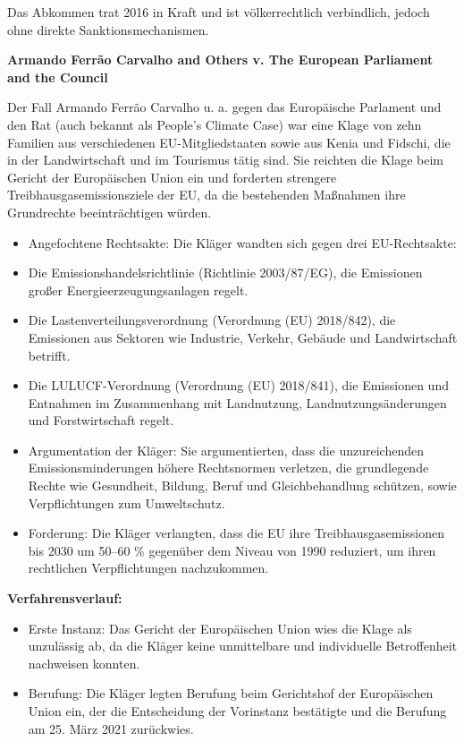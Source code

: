 \documentclass[a4paper, 12pt]{article} %
\begin{document}
 Das Abkommen trat 2016 in Kraft und ist völkerrechtlich verbindlich, jedoch ohne direkte Sanktionsmechanismen.

 \textbf{\cite{ArmandoFerraoCarvalho} Armando {{Ferrão Carvalho}} and {{Others}} v. {{The European Parliament}} and the {{Council}}}

 Der Fall Armando Ferrão Carvalho u. a. gegen das Europäische Parlament und den Rat (auch bekannt als \glqq{}People's Climate Case\grqq{}) war eine
  Klage von zehn Familien aus verschiedenen EU-Mitgliedstaaten sowie aus Kenia und Fidschi, die in der Landwirtschaft und im Tourismus tätig sind.
   Sie reichten die Klage beim Gericht der Europäischen 
 Union ein und forderten strengere Treibhausgasemissionsziele der EU, da die bestehenden Maßnahmen ihre Grundrechte beeinträchtigen würden.

 \begin{itemize}
    \item Angefochtene Rechtsakte: Die Kläger wandten sich gegen drei EU-Rechtsakte:
    \item Die Emissionshandelsrichtlinie (Richtlinie 2003/87/EG), die Emissionen großer Energieerzeugungsanlagen regelt.
    \item Die Lastenverteilungsverordnung (Verordnung (EU) 2018/842), die Emissionen aus Sektoren wie Industrie, Verkehr, Gebäude und Landwirtschaft betrifft.
    \item Die LULUCF-Verordnung (Verordnung (EU) 2018/841), die Emissionen und Entnahmen im Zusammenhang mit Landnutzung, Landnutzungsänderungen und Forstwirtschaft regelt.
    \item Argumentation der Kläger: Sie argumentierten, dass die unzureichenden Emissionsminderungen höhere Rechtsnormen verletzen, die grundlegende Rechte wie Gesundheit, Bildung, Beruf und Gleichbehandlung schützen, sowie Verpflichtungen zum Umweltschutz.
    \item Forderung: Die Kläger verlangten, dass die EU ihre Treibhausgasemissionen bis 2030 um 50–60 \% gegenüber dem Niveau von 1990 reduziert, um ihren rechtlichen Verpflichtungen nachzukommen.
 \end{itemize}

 \textbf{Verfahrensverlauf:}
 \begin{itemize}
    \item Erste Instanz: Das Gericht der Europäischen Union wies die Klage als unzulässig ab, da die Kläger keine unmittelbare und individuelle Betroffenheit nachweisen konnten.
    \item Berufung: Die Kläger legten Berufung beim Gerichtshof der Europäischen Union ein, der die Entscheidung der Vorinstanz bestätigte und die Berufung am 25. März 2021 zurückwies.
 \end{itemize}
\end{document}

